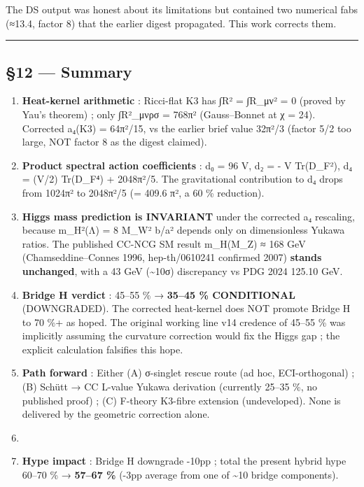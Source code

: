\documentclass[
  11pt,
  a4paper,
]{article}
\begin{document}
The DS output was honest about its limitations but contained two numerical fabs (≈13.4, factor 8) that the earlier digest propagated. This work corrects them.

\begin{center}\rule{0.5\linewidth}{0.5pt}\end{center}

\hypertarget{summary}{%
\subsection{§12 --- Summary}\label{summary}}

\begin{enumerate}
\def\labelenumi{\arabic{enumi}.}
\item
  \textbf{Heat-kernel arithmetic} : Ricci-flat K3 has ∫R² = ∫R\_μν² = 0 (proved by Yau's theorem) ; only ∫R²\_μνρσ = 768π² (Gauss--Bonnet at χ = 24). Corrected a₄(K3) = 64π²/15, vs the earlier brief value 32π²/3 (factor 5/2 too large, NOT factor 8 as the digest claimed).
\item
  \textbf{Product spectral action coefficients} : d₀ = 96 V, d₂ = - V Tr(D\_F²), d₄ = (V/2) Tr(D\_F⁴) + 2048π²/5. The gravitational contribution to d₄ drops from 1024π² to 2048π²/5 (= 409.6 π², a 60 \% reduction).
\item
  \textbf{Higgs mass prediction is INVARIANT} under the corrected a₄ rescaling, because m\_H²(Λ) = 8 M\_W² b/a² depends only on dimensionless Yukawa ratios. The published CC-NCG SM result m\_H(M\_Z) ≈ 168 GeV (Chamseddine--Connes 1996, hep-th/0610241 confirmed 2007) \textbf{stands unchanged}, with a 43 GeV (\textasciitilde10σ) discrepancy vs PDG 2024 125.10 GeV.
\item
  \textbf{Bridge H verdict} : 45--55 \% → \textbf{35--45 \% CONDITIONAL} (DOWNGRADED). The corrected heat-kernel does NOT promote Bridge H to 70 \%+ as hoped. The original working line v14 credence of 45--55 \% was implicitly assuming the curvature correction would fix the Higgs gap ; the explicit calculation falsifies this hope.
\item
  \textbf{Path forward} : Either (A) σ-singlet rescue route (ad hoc, ECI-orthogonal) ; (B) Schütt → CC L-value Yukawa derivation (currently 25--35 \%, no published proof) ; (C) F-theory K3-fibre extension (undeveloped). None is delivered by the geometric correction alone.
\item
\item
  \textbf{Hype impact} : Bridge H downgrade -10pp ; total the present hybrid hype 60--70 \% → \textbf{57--67 \%} (-3pp average from one of \textasciitilde10 bridge components).

\end{enumerate}
\end{document}
